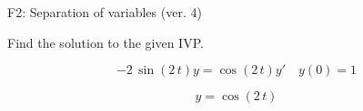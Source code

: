 \begin{exercise}
  \begin{exerciseTitle}F2: Separation of variables (ver. 4)\end{exerciseTitle}
  \begin{exerciseStatement}
    
Find the solution to the given IVP.

    
\[-2 \, \sin\left(2 \, t\right) y= \cos\left(2 \, t\right) y'\hspace{1em} y\left( 0 \right)= 1\]

  \end{exerciseStatement}
  \begin{exerciseAnswer}
    
\[y= \cos\left(2 \, t\right)\]

  \end{exerciseAnswer}
\end{exercise}